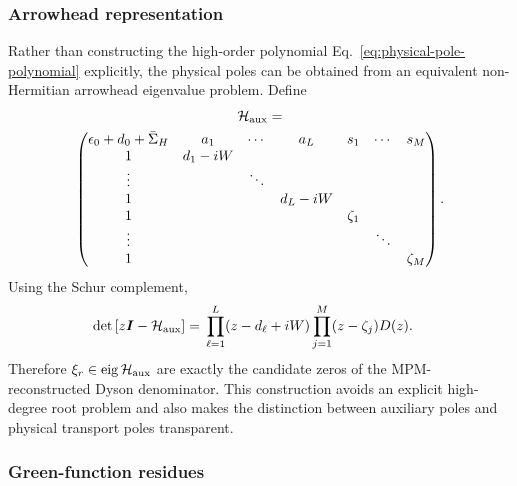 \documentclass[
 reprint,
 superscriptaddress,
 amsmath,amssymb,
 aps,prb,
 longbibliography,
 floatfix
]{revtex4-2}
\begin{document}
\subsubsection{Arrowhead representation}

Rather than constructing the high-order polynomial Eq.~\eqref{eq:physical-pole-polynomial} explicitly, the physical poles can be obtained from an equivalent non-Hermitian arrowhead eigenvalue problem. Define
\begin{equation*}
\begin{gathered}
\mathcal{H}_{\rm aux}
=\\
\begin{pmatrix}
\epsilon_0+d_0+\bar\Sigma_H & a_1 & \cdots & a_L & s_1 & \cdots & s_M \\
1 & d_1-iW & & & & & \\
\vdots & & \ddots & & & & \\
1 & & & d_L-iW & & & \\
1 & & & & \zeta_1 & & \\
\vdots & & & & & \ddots & \\
1 & & & & & & \zeta_M
\end{pmatrix}.
\end{gathered}
\end{equation*}
Using the Schur complement,
\begin{equation*}
\begin{aligned}
\det
\left[
z\bm I-\mathcal H_{\rm aux}
\right]
={}&
\prod_{\ell=1}^{L}
(z-d_\ell+iW)
\prod_{j=1}^{M}
(z-\zeta_j)
D(z).
\end{aligned}
\end{equation*}
Therefore $\xi_r \in \operatorname{eig} \mathcal H_{\rm aux}$ are exactly the candidate zeros of the MPM-reconstructed Dyson denominator. This construction avoids an explicit high-degree root problem and also makes the distinction between auxiliary poles and physical transport poles transparent.

\subsubsection{Green-function residues}
\end{document}
